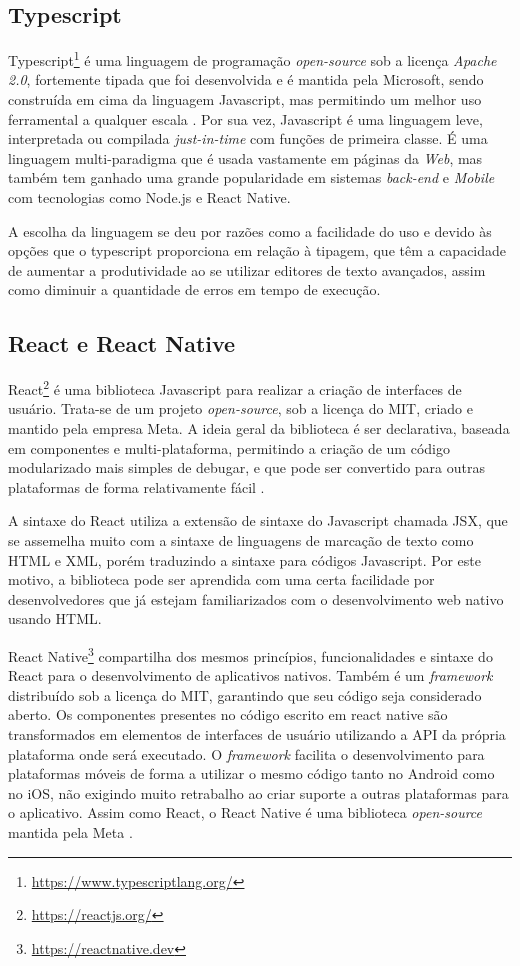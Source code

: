 \subsection{Typescript}

Typescript\footnote{\url{https://www.typescriptlang.org/}} é uma linguagem de programação \textit{open-source} sob a licença \textit{Apache 2.0}, fortemente tipada que foi desenvolvida e é mantida pela Microsoft, sendo construída em cima da linguagem Javascript, mas permitindo um melhor uso ferramental a qualquer escala \cite{typescript}. Por sua vez, Javascript \cite{javascript} é uma linguagem leve, interpretada ou compilada \textit{just-in-time} com funções de primeira classe. É uma linguagem multi-paradigma que é usada vastamente em páginas da \textit{Web}, mas também tem ganhado uma grande popularidade em sistemas \textit{back-end} e \textit{Mobile} com tecnologias como Node.js e React Native.

A escolha da linguagem se deu por razões como a facilidade do uso e devido às opções que o typescript proporciona em relação à tipagem, que têm a capacidade de aumentar a produtividade ao se utilizar editores de texto avançados, assim como diminuir a quantidade de erros em tempo de execução.

\subsection{React e React Native}
\label{react-section}

React\footnote{\url{https://reactjs.org/}} é uma biblioteca Javascript para realizar a criação de interfaces de usuário. Trata-se de um projeto \textit{open-source}, sob a licença do MIT, criado e mantido pela empresa Meta. A ideia geral da biblioteca é ser declarativa, baseada em componentes e multi-plataforma, permitindo a criação de um código modularizado mais simples de debugar, e que pode ser convertido para outras plataformas de forma relativamente fácil \cite{react}.

A sintaxe do React utiliza a extensão de sintaxe do Javascript chamada JSX, que se assemelha muito com a sintaxe de linguagens de marcação de texto como HTML e XML, porém traduzindo a sintaxe para códigos Javascript. Por este motivo, a biblioteca pode ser aprendida com uma certa facilidade por desenvolvedores que já estejam familiarizados com o desenvolvimento web nativo usando HTML.

React Native\footnote{\url{https://reactnative.dev}} compartilha dos mesmos princípios, funcionalidades e sintaxe do React para o desenvolvimento de aplicativos nativos. Também é um \textit{framework} distribuído sob a licença do MIT, garantindo que seu código seja considerado aberto. Os componentes presentes no código escrito em react native são transformados em elementos de interfaces de usuário utilizando a API da própria plataforma onde será executado. O \textit{framework} facilita o desenvolvimento para plataformas móveis de forma a utilizar o mesmo código tanto no Android como no iOS, não exigindo muito retrabalho ao criar suporte a outras plataformas para o aplicativo. Assim como React, o React Native é uma biblioteca \textit{open-source} mantida pela Meta \cite{react-native}.

